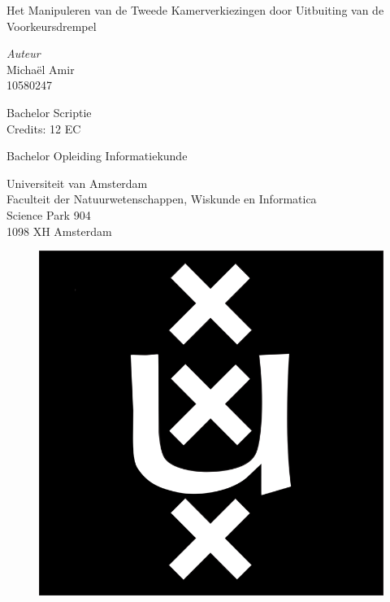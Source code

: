 

\begin{center}

\vspace{2.5cm}

\begin{Huge}
Het Manipuleren van de Tweede Kamerverkiezingen door Uitbuiting van de Voorkeursdrempel
\end{Huge}

\vspace{1.5cm}

\emph{Auteur}\\
Micha\"{e}l Amir\\
10580247

\vspace{0.5cm}

Bachelor Scriptie\\
Credits: 12 EC

\vspace{0.5cm}

Bachelor Opleiding Informatiekunde

\vspace{0.25cm}

Universiteit van Amsterdam\\
Faculteit der Natuurwetenschappen, Wiskunde en Informatica\\
Science Park 904\\
1098 XH Amsterdam

\vspace{1cm}
\begin{figure}[H]
\centering

	\includegraphics[width=0.1\linewidth]{UVA.png}


\end{figure}
\end{center}
